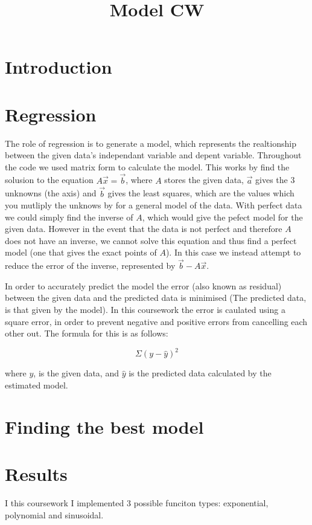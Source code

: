 \documentclass[]{article}
\title{Model CW }
\begin{document}
\maketitle

\section{Introduction}

\section{Regression}
The role of regression is to generate a model, which represents the realtionship between the given data's independant variable and depent variable. Throughout the code we used matrix form to calculate the model. This works by find the solusion to the equation $A\overrightarrow{x} = \overrightarrow{b}$, where $A$ stores the given data, $\overrightarrow{a}$ gives the 3 unknowns (the axis) and $\overrightarrow{b}$ gives the least squares, which are the values which you mutliply the unknows by for a general model of the data. With perfect data we could simply find the inverse of $A$, which would give the pefect model for the given data. However in the event that the data is not perfect and therefore $A$ does not have an inverse, we cannot solve this equation and thus find a perfect model (one that gives the exact points of $A$). In this case we instead attempt to reduce the error of the inverse, represented by $\overrightarrow{b} - A\overrightarrow{x}$.

In order to accurately predict the model the error (also known as residual) between the given data and the predicted data is minimised (The predicted data, is that given by the model). In this coursework the error is caulated using a square error, in order to prevent negative and positive errors from cancelling each other out. The formula for this is as follows: 

\begin{equation}
  \Sigma (y - \hat{y})^2
\end {equation}

where \(y\), is the given data, and \(\hat{y}\) is the predicted data calculated by the estimated model.

\section{Finding the best model}

\section{Results}

I this coursework I implemented 3 possible funciton types: exponential, polynomial and sinusoidal. 
\end{document}
